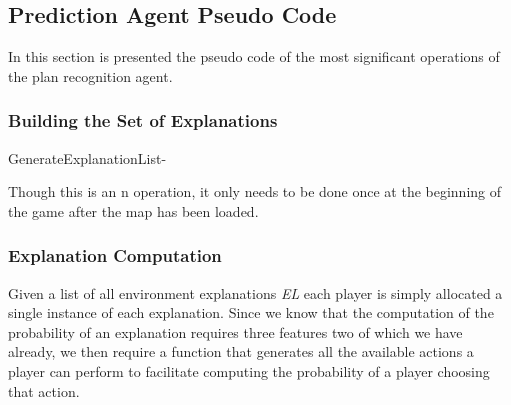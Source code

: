 \documentclass[parskip]{cs4rep}
\begin{document}
\subsection{Prediction Agent Pseudo Code}

In this section is presented the pseudo code of the most significant operations of the plan recognition agent.

\subsubsection{Building the Set of Explanations}

\begin{pseudocode}[ruled]{GenerateExplanationList}{-}
\begin{algorithm}[H]
\end{algorithm}
\end{pseudocode}

Though this is an n operation, it only needs to be done once at the beginning of the game after the map has been loaded.

\subsubsection{Explanation Computation}

Given a list of all environment explanations \textit{EL} each player is simply allocated a single instance of each explanation. Since we know that the computation of the probability of an explanation requires three features two of which we have already, we then require a function that generates all the available actions a player can perform to facilitate computing the probability of a player choosing that action.
\end{document}
